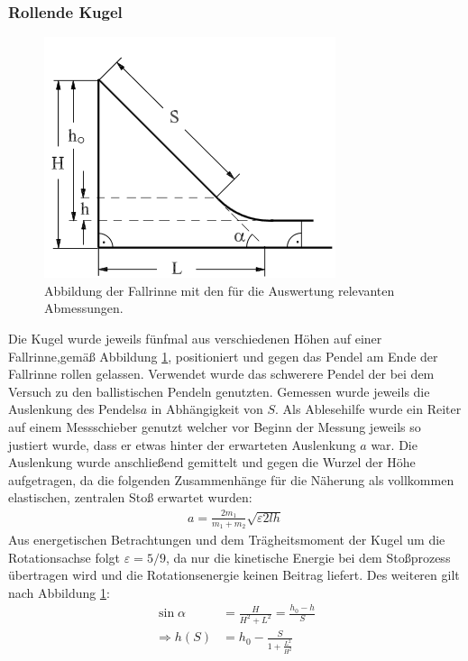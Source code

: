 \subsubsection*{Rollende Kugel}

\begin{figure}[h]
	\centering
	\includegraphics[width=0.7\linewidth]{res/FallrinneSkizze}
	\caption{Abbildung der Fallrinne mit den für die Auswertung relevanten Abmessungen\cite{anleitung-ws2017}.}
	\label{fig:rinneskizze}
\end{figure}

Die Kugel wurde jeweils fünfmal aus verschiedenen Höhen auf einer Fallrinne,gemäß Abbildung \ref{fig:rinneskizze}, positioniert und gegen das Pendel am Ende der Fallrinne rollen gelassen. Verwendet wurde das schwerere Pendel der bei dem Versuch zu den ballistischen Pendeln genutzten. Gemessen wurde jeweils die Auslenkung des Pendels$a$ in Abhängigkeit von $S$. Als Ablesehilfe wurde ein Reiter auf einem Messschieber genutzt welcher vor Beginn der Messung jeweils so justiert wurde, dass er etwas hinter der erwarteten Auslenkung $a$ war.
Die Auslenkung wurde anschließend gemittelt und gegen die Wurzel der Höhe aufgetragen, da die folgenden Zusammenhänge für die Näherung als vollkommen elastischen, zentralen Stoß erwartet wurden:
\begin{align}
a=\frac{2m_1}{m_1+m_2}\sqrt{\varepsilon 2 l h} \label{eq:alenkrinne}
\end{align}
Aus energetischen Betrachtungen und dem Trägheitsmoment der Kugel um die Rotationsachse folgt $\varepsilon= 5/9$, da nur die kinetische Energie  bei dem Stoßprozess übertragen wird und die Rotationsenergie keinen Beitrag liefert.
Des weiteren gilt nach Abbildung \ref{fig:rinneskizze}:
\begin{align}
\sin \alpha &=\frac{H}{H^2+L^2}=\frac{h_0-h}{S} \\
\Rightarrow  h(S) &= h_0-\frac{S}{1+\frac{L^2}{H^2}}
\end{align}













